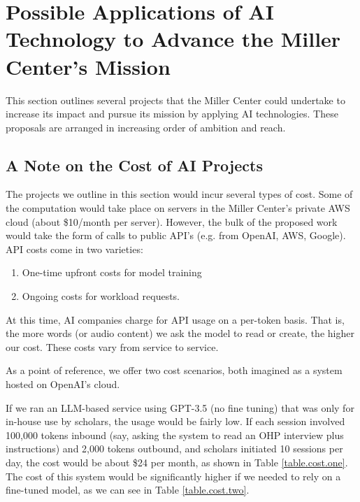 \documentclass[12pt, oneside]{article}   	%
\begin{document}
\section{Possible Applications of AI Technology to Advance the Miller Center's Mission}\label{section.applications}
This section outlines several projects that the Miller Center could undertake to increase its impact and pursue its mission by applying AI technologies.  These proposals are arranged in increasing order of ambition and reach.  

\subsection{A Note on the Cost of AI Projects}\label{section.applications.cost}
The projects we outline in this section would incur several  types of cost.  Some of the computation would take place on servers in the Miller Center's private AWS cloud (about \$10/month per server).  However, the bulk of the proposed work would take the form of calls to public API's (e.g. from OpenAI, AWS, Google).  API costs come in two varieties:
\begin{enumerate}
\item One-time upfront costs for model training
\item Ongoing costs for workload requests.
\end{enumerate}
At this time, AI companies charge for API usage on a per-token basis.  That is, the more words (or audio content) we ask the model to read or create, the higher our cost.  These costs vary from service to service.  

As a point of reference, we offer two cost scenarios, both imagined as a system hosted on OpenAI's cloud.

If we ran an LLM-based service using GPT-3.5 (no fine tuning) that was only for in-house use by scholars, the usage would be fairly low.  If each session involved 100,000 tokens inbound (say, asking the system to read an OHP interview plus instructions) and 2,000 tokens outbound, and scholars initiated 10 sessions per day, the cost  would be about \$24 per month, as shown in Table \ref{table.cost.one}.  The cost of this system would be significantly higher if we needed to rely on a fine-tuned model, as we can see in Table \ref{table.cost.two}.
\end{document}
